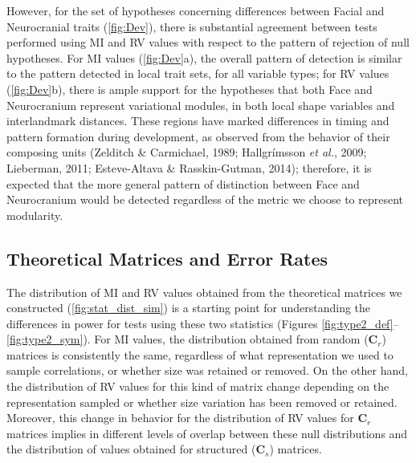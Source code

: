 \documentclass[12pt,twoside]{report}
\begin{document}
However, for the set of hypotheses concerning differences between Facial
and Neurocranial traits (\autoref{fig:Dev}), there is substantial
agreement between tests performed using MI and RV values with respect to
the pattern of rejection of null hypotheses. For MI values
(\autoref{fig:Dev}a), the overall pattern of detection is similar to the
pattern detected in local trait sets, for all variable types; for RV
values (\autoref{fig:Dev}b), there is ample support for the hypotheses
that both Face and Neurocranium represent variational modules, in both
local shape variables and interlandmark distances. These regions have
marked differences in timing and pattern formation during development,
as observed from the behavior of their composing units (Zelditch \&
Carmichael, 1989; Hallgrímsson \emph{et al.}, 2009; Lieberman, 2011;
Esteve-Altava \& Rasskin-Gutman, 2014); therefore, it is expected that
the more general pattern of distinction between Face and Neurocranium
would be detected regardless of the metric we choose to represent
modularity.

\subsection{Theoretical Matrices and Error
Rates}\label{theoretical-matrices-and-error-rates}

The distribution of MI and RV values obtained from the theoretical
matrices we constructed (\autoref{fig:stat_dist_sim}) is a starting
point for understanding the differences in power for tests using these
two statistics (Figures \ref{fig:type2_def}--\ref{fig:type2_sym}). For
MI values, the distribution obtained from random ($\mathbf{C}_r$)
matrices is consistently the same, regardless of what representation we
used to sample correlations, or whether size was retained or removed. On
the other hand, the distribution of RV values for this kind of matrix
change depending on the representation sampled or whether size variation
has been removed or retained. Moreover, this change in behavior for the
distribution of RV values for $\mathbf{C}_r$ matrices implies in
different levels of overlap between these null distributions and the
distribution of values obtained for structured ($\mathbf{C}_s$)
matrices.
\end{document}

